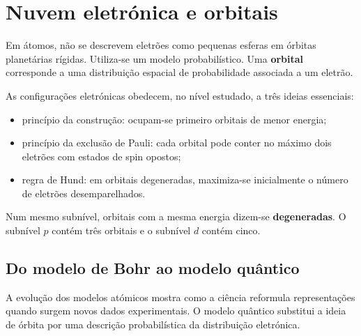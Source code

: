 \documentclass[11pt,a4paper,oneside]{book}
\begin{document}
\section{Nuvem eletrónica e orbitais}
Em átomos, não se descrevem eletrões como pequenas esferas em órbitas planetárias rígidas. Utiliza-se um modelo probabilístico. Uma \textbf{orbital} corresponde a uma distribuição espacial de probabilidade associada a um eletrão.

As configurações eletrónicas obedecem, no nível estudado, a três ideias essenciais:
\begin{itemize}
  \item princípio da construção: ocupam-se primeiro orbitais de menor energia;
  \item princípio da exclusão de Pauli: cada orbital pode conter no máximo dois eletrões com estados de spin opostos;
  \item regra de Hund: em orbitais degeneradas, maximiza-se inicialmente o número de eletrões desemparelhados.
\end{itemize}

\begin{center}
\end{center}

Num mesmo subnível, orbitais com a mesma energia dizem-se \textbf{degeneradas}. O subnível $p$ contém três orbitais e o subnível $d$ contém cinco.


\subsection*{Do modelo de Bohr ao modelo quântico}
A evolução dos modelos atómicos mostra como a ciência reformula representações quando surgem novos dados experimentais. O modelo quântico substitui a ideia de órbita por uma descrição probabilística da distribuição eletrónica.
\end{document}
